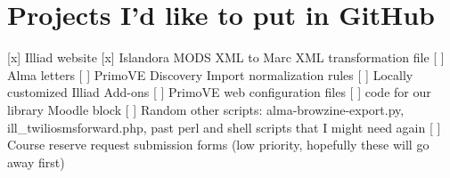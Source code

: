 \documentclass[
  openany]{book}
\begin{document}
\hypertarget{projects-id-like-to-put-in-github}{%
\chapter{Projects I'd like to put in GitHub}\label{projects-id-like-to-put-in-github}}

{[}x{]} Illiad website
{[}x{]} Islandora MODS XML to Marc XML transformation file
{[} {]} Alma letters
{[} {]} PrimoVE Discovery Import normalization rules
{[} {]} Locally customized Illiad Add-ons
{[} {]} PrimoVE web configuration files
{[} {]} code for our library Moodle block
{[} {]} Random other scripts: alma-browzine-export.py, ill\_twiliosmsforward.php, past perl and shell scripts that I might need again
{[} {]} Course reserve request submission forms (low priority, hopefully these will go away first)
\end{document}
